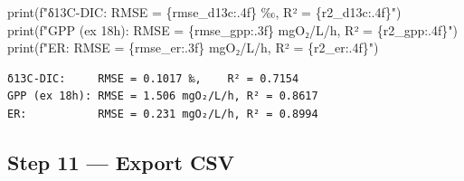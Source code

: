 \documentclass[
  letterpaper,
  DIV=11,
  numbers=noendperiod]{scrartcl}
\newenvironment{Shaded}{\begin{snugshade}}{\end{snugshade}}
\newcommand{\BuiltInTok}[1]{\textcolor[rgb]{0.00,0.23,0.31}{#1}}
\newcommand{\NormalTok}[1]{\textcolor[rgb]{0.00,0.23,0.31}{#1}}
\newcommand{\SpecialCharTok}[1]{\textcolor[rgb]{0.37,0.37,0.37}{#1}}
\newcommand{\SpecialStringTok}[1]{\textcolor[rgb]{0.13,0.47,0.30}{#1}}
\begin{document}
\begin{Shaded}
\begin{Highlighting}[]
\BuiltInTok{print}\NormalTok{(}\SpecialStringTok{f"δ13C{-}DIC:     RMSE = }\SpecialCharTok{\{}\NormalTok{rmse\_d13c}\SpecialCharTok{:.4f\}}\SpecialStringTok{ ‰,    R² = }\SpecialCharTok{\{}\NormalTok{r2\_d13c}\SpecialCharTok{:.4f\}}\SpecialStringTok{"}\NormalTok{)}
\BuiltInTok{print}\NormalTok{(}\SpecialStringTok{f"GPP (ex 18h): RMSE = }\SpecialCharTok{\{}\NormalTok{rmse\_gpp}\SpecialCharTok{:.3f\}}\SpecialStringTok{ mgO₂/L/h, R² = }\SpecialCharTok{\{}\NormalTok{r2\_gpp}\SpecialCharTok{:.4f\}}\SpecialStringTok{"}\NormalTok{)}
\BuiltInTok{print}\NormalTok{(}\SpecialStringTok{f"ER:           RMSE = }\SpecialCharTok{\{}\NormalTok{rmse\_er}\SpecialCharTok{:.3f\}}\SpecialStringTok{ mgO₂/L/h, R² = }\SpecialCharTok{\{}\NormalTok{r2\_er}\SpecialCharTok{:.4f\}}\SpecialStringTok{"}\NormalTok{)}
\end{Highlighting}
\end{Shaded}

\begin{verbatim}
δ13C-DIC:     RMSE = 0.1017 ‰,    R² = 0.7154
GPP (ex 18h): RMSE = 1.506 mgO₂/L/h, R² = 0.8617
ER:           RMSE = 0.231 mgO₂/L/h, R² = 0.8994
\end{verbatim}

\subsection{Step 11 --- Export CSV}\label{step-11-export-csv}
\end{document}
